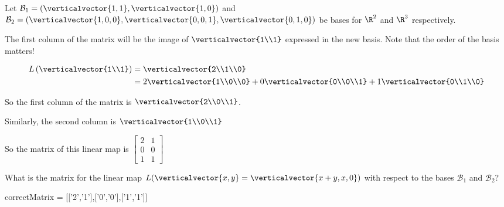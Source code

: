 \documentclass{ximera}
\begin{document}
\begin{problem}
	Let $\mathcal{B}_1 = (\verticalvector{1,1},\verticalvector{1,0})$ and $\mathcal{B}_2 = (\verticalvector{1,0,0},\verticalvector{0,0,1},\verticalvector{0,1,0})$ be bases
	for $\R^2$ and $\R^3$ respectively. 
	\begin{solution}
	\begin{hint}
		The first column of the matrix will be the image of $\verticalvector{1\\1}$ expressed in the new basis.  Note that the order of the basis matters!
	\end{hint}
	\begin{hint}
		\begin{align*}
			L\left(\verticalvector{1\\1}\right) &= \verticalvector{2\\1\\0}\\
				&= 2\verticalvector{1\\0\\0}+0\verticalvector{0\\0\\1}+1\verticalvector{0\\1\\0}\\
		\end{align*}
	\end{hint}
	\begin{hint}
		So the first column of the matrix is $\verticalvector{2\\0\\1}$.
	\end{hint}
	\begin{hint}
		Similarly, the second column is $\verticalvector{1\\0\\1}$
	\end{hint}
	\begin{hint}
		So the matrix of this linear map is \(\begin{bmatrix} 2 & 1 \\0& 0\\ 1 & 1\end{bmatrix}\)
	\end{hint}
	 What is the matrix for the linear map $L(\verticalvector{x,y} = \verticalvector{x+y,x,0})$ with respect to the 
	bases $\mathcal{B}_1$  and $\mathcal{B}_2$?
	\begin{matrix-answer}
		correctMatrix = [['2','1'],['0','0'],['1','1']]
	\end{matrix-answer}
	\end{solution}
\end{problem}
\end{document}

